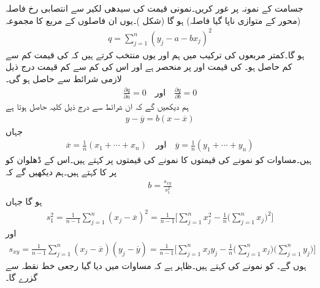 جسامت  کے نمونہ  پر غور کریں۔نمونی قیمت  کی سیدھی لکیر  سے انتصابی رخ فاصلہ (محور  کے متوازی ناپا گیا فاصلہ)  ہو گا (شکل )۔یوں ان فاصلوں کے مربع کا مجموعہ
\begin{align}\label{مساوات_شماریات_سیدھا_خط_بٹھانا_الف}
q=\sum_{j=1}^{n}(y_j-a-bx_j)^2
\end{align}
ہو گا۔کمتر مربعوں کی ترکیب میں ہم  اور  یوں منتخب کرتے ہیں کہ  کی قیمت کم سے کم حاصل ہو۔ کی قیمت  اور  پر منحصر ہے اور اس کی کم سے کم قیمت درج ذیل لازمی شرائط سے حاصل ہو گی۔
\begin{align}\label{مساوات_شماریات_سیدھا_خط_بٹھانا_ب}
\frac{\partial q}{\partial a}=0 \quad \text{اور}\quad \frac{\partial q}{\partial b}=0
\end{align}
ہم دیکھیں گے کہ ان شرائط سے درج ذیل کلیہ حاصل ہوتا ہے
\begin{align}\label{مساوات_شماریات_سیدھا_خط_بٹھانا_پ}
y-\overline{y}=b(x-\overline{x})
\end{align}
جہاں
\begin{align}\label{مساوات_شماریات_سیدھا_خط_بٹھانا_ت}
\overline{x}=\frac{1}{n}(x_1+\cdots+x_n)\quad \text{اور}\quad \overline{y}=\frac{1}{n}(y_1+\cdots+y_n)
\end{align}
ہیں۔مساوات  کو نمونے کی  قیمتوں کا نمونے کی  قیمتوں پر   کہتے ہیں۔اس کے ڈھلوان  کو  پر  کا  کہتے ہیں۔ہم دیکھیں گے کہ 
\begin{align}\label{مساوات_شماریات_سیدھا_خط_بٹھانا_ٹ}
b=\frac{s_{xy}}{s_1^2}
\end{align}
ہو گا جہاں 
\begin{align}\label{مساوات_شماریات_سیدھا_خط_بٹھانا_ث}
s_1^2=\frac{1}{n-1}\sum_{j=1}^{n}(x_j-\overline{x})^2=\frac{1}{n-1}\big[\sum_{j=1}^{n}x_j^2-\frac{1}{n}\big(\sum_{j=1}^{n}x_j\big)^2\big]
\end{align}
اور
\begin{align}\label{مساوات_شماریات_سیدھا_خط_بٹھانا_ج}
s_{xy}=\frac{1}{n-1}\sum_{j=1}^{n}(x_j-\overline{x})(y_j-\overline{y})=\frac{1}{n-1}\big[\sum_{j=1}^{n}x_jy_j-\frac{1}{n}\big(\sum_{j=1}^{n}x_j\big)\big(\sum_{j=1}^{n}y_j\big)\big]
\end{align}
ہوں گے۔ کو نمونے کی  کہتے ہیں۔ظاہر ہے کہ مساوات  میں دیا گیا رجعی خط نقطہ  سے گزرے گا۔ 

